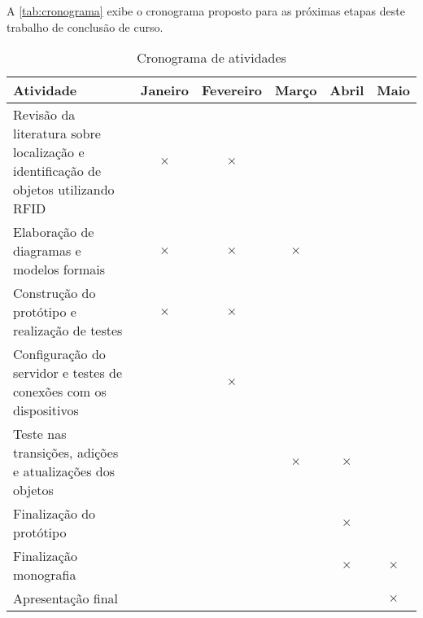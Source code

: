 \label{chapter:cronograma}

A \autoref{tab:cronograma} exibe o cronograma proposto para as próximas etapas deste trabalho de conclusão de curso.

\begin{table}[htbp]
  \centering
  \caption{Cronograma de atividades}
  \label{tab:cronograma}
  \begin{tabularx}{\textwidth}{|X|c|c|c|c|c|}
    \hline
    \textbf{Atividade} & \textbf{Janeiro} & \textbf{Fevereiro} & \textbf{Março} & \textbf{Abril} & \textbf{Maio} \\
    \hline
    Revisão da literatura sobre localização e identificação de objetos utilizando RFID & \(\times\) & \(\times\) & & & \\
    \hline
    Elaboração de diagramas e modelos formais & \(\times\) &  \(\times\) & \(\times\) & & \\
    \hline
    Construção do protótipo e realização de testes & \(\times\) &  \(\times\) & & & \\
    \hline
   Configuração do servidor e testes de conexões com os dispositivos & & \(\times\) & & & \\
    \hline
    Teste nas transições, adições e atualizações dos objetos & & & \(\times\) & \(\times\) &  \\
    \hline
    Finalização do protótipo & & &  & \(\times\) & \\
    \hline
    Finalização monografia & & & & \(\times\) & \(\times\) \\
    \hline
    Apresentação final & & & &  & \(\times\) \\
    \hline
  \end{tabularx}
\end{table}



